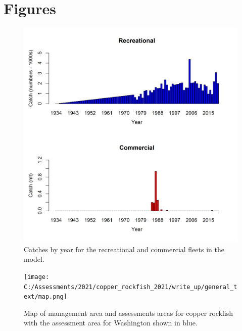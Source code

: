 \documentclass[11pt,
  english,
  a4paper,
]{article}
\begin{document}
\clearpage



\clearpage

\clearpage


\hypertarget{figures}{%
\section{Figures}\label{figures}}

\leavevmode\tagmcend\tagstructend


\begin{figure}
\centering
\includegraphics[width=1\textwidth,height=1\textheight]{figs/catches_wa.png}
\caption{Catches by year for the recreational and commercial fleets in the model.\label{fig:catch}}
\end{figure}

\tagmcend\tagstructend


\begin{figure}
\centering
\texttt{[image: C:/Assessments/2021/copper\_rockfish\_2021/write\_up/general\_text/map.png]}
\caption{Map of management area and assessments areas for copper rockfish with the assessment area for Washington shown in blue.\label{fig:map}}
\end{figure}
\end{document}
